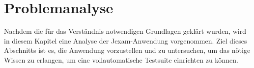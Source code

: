 \chapter{Problemanalyse}\label{ch:problemanalyse}


Nachdem die f\"ur das Verständnis notwendigen Grundlagen gekl\"art wurden,
wird in diesem Kapitel eine Analyse der Jexam-Anwendung vorgenommen.
Ziel dieses Abschnitts ist es, die Anwendung vorzustellen und zu untersuchen,
um das n\"otige Wissen zu erlangen, um eine vollautomatische Testsuite
einrichten zu können.



